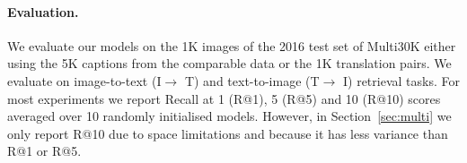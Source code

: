 \paragraph{Evaluation.}
We evaluate our models on the 1K images of the 2016 test set of Multi30K either using the 5K captions from the comparable data or the 1K translation pairs. We evaluate on image-to-text (I$\rightarrow$ T) and text-to-image (T$\rightarrow$ I) retrieval tasks. For most experiments we  report Recall at 1 (R@1), 5 (R@5) and 10 (R@10) scores averaged over 10 randomly initialised models. However, in Section~\ref{sec:multi} we only report R@10 due to space limitations and because it has less variance than R@1 or R@5.




